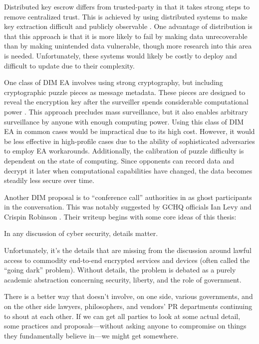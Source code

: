 Distributed key escrow differs from trusted-party in that it takes strong steps to remove centralized trust. This is
achieved by using distributed systems to make key extraction difficult and publicly observable \cite{phan_key_2017}
\cite{servan_schreiber_jje_2020}. One advantage of distribution is that this approach is that it is more likely to fail
by making data unrecoverable than by making unintended data vulnerable, though more research into this area is needed.
Unfortunately, these systems would likely be costly to deploy and difficult to update due to their complexity.

One class of \ac{DIM} \ac{EA} involves using strong cryptography, but including cryptographic puzzle pieces as message
metadata. These pieces are designed to reveal the encryption key after the surveiller spends considerable computational
power \cite{bellare_translucent_1996} \cite{wright_crypto_2018}. This approach precludes mass surveillance, but it also
enables arbitrary surveillance by anyone with enough computing power. Using this class of \ac{DIM} \ac{EA} in common
cases would be impractical due to its high cost. However, it would be less effective in high-profile cases due to the
ability of sophisticated adversaries to employ \ac{EA} workarounds. Additionally, the calibration of puzzle difficulty
is dependent on the state of computing. Since opponents can record data and decrypt it later when computational
capabilities have changed, the data becomes steadily less secure over time.

Another \ac{DIM} proposal is to ``conference call'' authorities in as ghost participants in the conversation. This was
notably suggested by \ac{GCHQ} officials Ian Levy and Crispin Robinson \cite{levy_robinson_2018}. Their writeup begins
with some core ideas of this thesis:

\begin{displayquote}
In any discussion of cyber security, details matter.

Unfortunately, it's the details that are missing from the discussion around lawful access to commodity end-to-end
encrypted services and devices (often called the ``going dark'' problem). Without details, the problem is debated as a
purely academic abstraction concerning security, liberty, and the role of government.

There is a better way that doesn’t involve, on one side, various governments, and on the other side lawyers,
philosophers, and vendors' PR departments continuing to shout at each other. If we can get all parties to look at some
actual detail, some practices and proposals---without asking anyone to compromise on things they fundamentally believe
in---we might get somewhere.
\cite{levy_robinson_2018}
\end{displayquote}

